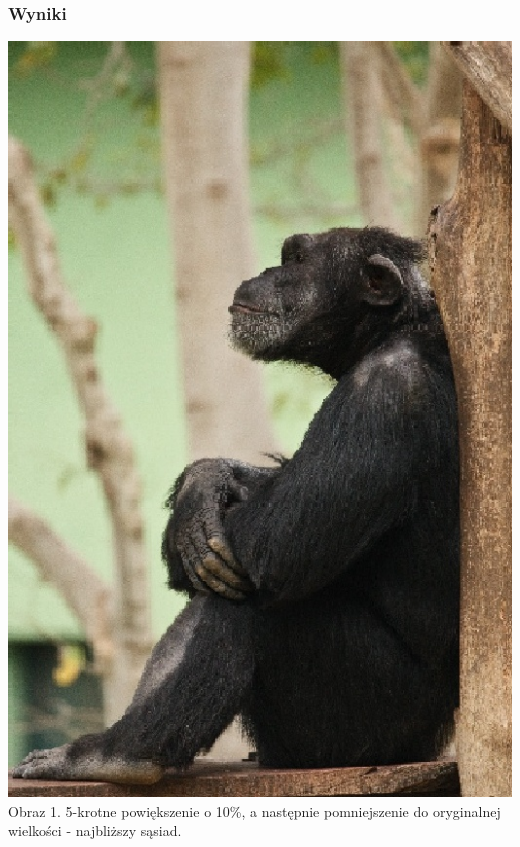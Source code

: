 \documentclass[14pt]{article}
\begin{document}
\subsubsection{Wyniki}
\begin{center}
    \includegraphics[scale=0.3]{images/5x_BACK_TO_ORG_nn.jpg}
    \\ \small Obraz 1. 5-krotne powiększenie o 10\%, a następnie pomniejszenie
    do oryginalnej wielkości - najbliższy sąsiad.


\end{center}
\end{document}
